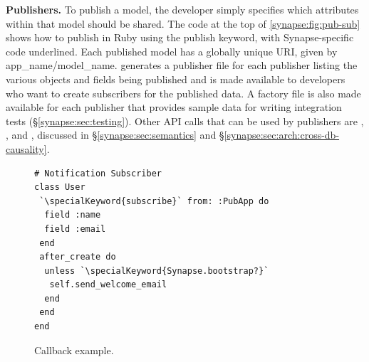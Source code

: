 {\bf Publishers.} 
To publish a model, the developer simply specifies which attributes within that
model should be shared.
The code at the top of
\F\ref{synapse:fig:pub-sub} shows how to publish
in Ruby using the {\code publish} keyword, with Synapse-specific code
underlined.  
Each published model has a globally unique URI, given by {\code
app\_name/model\_name}.  \synapse generates a publisher file for each
publisher listing the various objects and fields being published and is made
available to developers who want to create subscribers for the published data.
A factory file is also made available for each publisher that provides sample
data for writing integration tests (\S\ref{synapse:sec:testing}). 
Other API calls that
can be used by publishers are {}, {}, and {}, discussed in
\S\ref{synapse:sec:semantics} and \S\ref{synapse:sec:arch:cross-db-causality}.

\begin{figure}
\centering
\begin{minipage}{.4\textwidth}
\begin{lstlisting}[framexleftmargin=5pt]
# Notification Subscriber
class User
 `\specialKeyword{subscribe}` from: :PubApp do
  field :name
  field :email
 end
 after_create do
  unless `\specialKeyword{Synapse.bootstrap?}`
   self.send_welcome_email
  end
 end
end
\end{lstlisting}
\end{minipage}
\caption{Callback example.}
\label{synapse:fig:welcome-email}
\end{figure}


